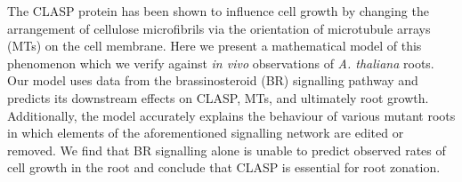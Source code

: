 The CLASP protein has been shown to influence cell growth by changing the arrangement of cellulose microfibrils via the orientation of microtubule arrays (MTs) on the cell membrane.
Here we present a mathematical model of this phenomenon which we verify against \emph{in vivo} observations of \emph{A. thaliana} roots. 
Our model uses data from the brassinosteroid (BR) signalling pathway and predicts its downstream effects on CLASP, MTs, and ultimately root growth. 
Additionally, the model accurately explains the behaviour of various mutant roots in which elements of the aforementioned signalling network are edited or removed. 
We find that BR signalling alone is unable to predict observed rates of cell growth in the root and conclude that CLASP is essential for root zonation.

